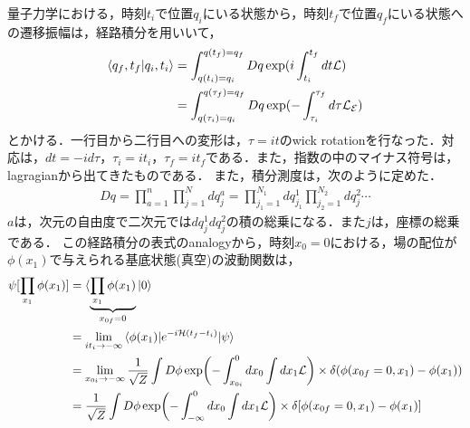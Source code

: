 量子力学における，時刻$t_i$で位置$q_i$にいる状態から，時刻$t_f$で位置$q_f$にいる状態への遷移振幅は，経路積分を用いいて，
\begin{align}
  \braket{q_f,t_f|q_i,t_i}&=\int^{q(t_f)=q_f}_{q(t_i)=q_i}Dq \exp(i\int^{t_f}_{t_i}dt\mathcal{L})\\
  &=\int^{q(\tau_f)=q_f}_{q(\tau_i)=q_i}Dq \exp(-\int^{\tau_f}_{\tau_i}d\tau\mathcal{L_{E}})
\end{align}
とかける．一行目から二行目への変形は，$\tau=it$のwick rotationを行なった．対応は，$dt=-id\tau$，$\tau_i=it_i$，$\tau_f=it_f$である．また，指数の中のマイナス符号は，lagragianから出てきたものである．
また，積分測度は，次のように定めた．
\begin{align}
  Dq=\prod_{a=1}^{n}\prod_{j=1}^{N}dq_{j}^a=\prod_{j_1=1}^{N_1}dq_{j_1}^1\prod_{j_2=1}^{N_2}dq_{j}^2\cdots
\end{align}
$a$は，次元の自由度で二次元では$dq_{j}^1 dq_{j}^2$の積の総乗になる．また$j$は，座標の総乗である．
この経路積分の表式のanalogyから，時刻$x_0=0$における，場の配位が$\phi(x_1)$で与えられる基底状態(真空)の波動関数は，
\begin{align}
  \psi[\prod_{x_1}\phi(x_{1})]&=\braket{\underbrace{\prod_{x_1}\phi(x_1)}_{x_{0f}=0}|0} \\
  \label{a}
  &=\lim_{it_i\to -\infty}\braket{\phi(x_1)|e^{-i\mathcal
  {H}(t_f-t_i)}|\psi}\\
  &=\lim_{x_{0i}\to -\infty}\frac{1}{\sqrt{Z}} \int D\phi \exp\biggl(-\int^{0}_{x_{0i}}dx_0\int dx_1\mathcal{L}\biggr)\times\delta(\phi(x_{0f}=0,x_1)-\phi(x_1))\\
  \label{b}
  &=\frac{1}{\sqrt{Z}} \int D\phi \exp\biggl(-\int^{0}_{-\infty}dx_0\int dx_1\mathcal{L}\biggr)\times\delta[\phi(x_{0f}=0,x_1)-\phi(x_1)]
\end{align}
